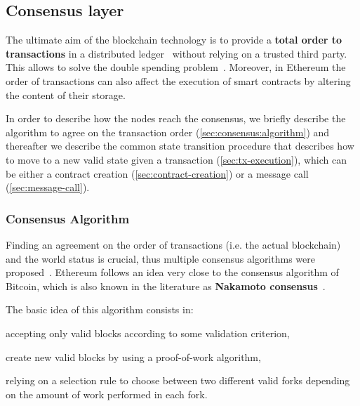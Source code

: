 \subsection{Consensus layer}
\label{sec:consensus}

The ultimate aim of the blockchain technology is to provide a \textbf{total
order to transactions} in a distributed ledger~\cite{bib:the-quest} without
relying on a trusted third party. This allows to solve the double spending
problem~\cite{bib:bitcoin}. Moreover, in Ethereum the order of transactions can
also affect the execution of smart contracts by altering the content of their
storage.

In order to describe how the nodes reach the consensus, we briefly describe the
algorithm to agree on the transaction order (\autoref{sec:consensus:algorithm})
and thereafter we describe the common state transition procedure that describes
how to move to a new valid state given a transaction
(\autoref{sec:tx-execution}), which can be either a contract creation
(\autoref{sec:contract-creation}) or a message call
(\autoref{sec:message-call}).


\subsubsection{Consensus Algorithm}
\label{sec:consensus:algorithm}

Finding an agreement on the order of transactions (i.e. the actual blockchain)
and the world status is crucial, thus multiple consensus algorithms were
proposed~\cite{bib:the-quest}. Ethereum follows an idea very close to the
consensus algorithm of Bitcoin, which is also known in the literature as
\textbf{Nakamoto consensus}~\cite{bib:bitcoin-ng}.

The basic idea of this algorithm consists in:
\begin{enumerate*}[label=(\arabic*)]
  \item accepting only valid blocks according to some validation criterion,
  \item create new valid blocks by using a proof-of-work algorithm,
  \item relying on a selection rule to choose between two different valid forks
  depending on the amount of work performed in each fork.
\end{enumerate*}

